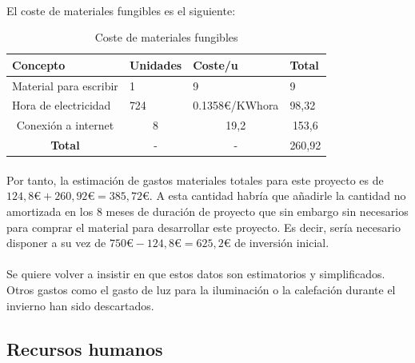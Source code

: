 \documentclass{article}
\begin{document}
\paragraph{}
El coste de materiales fungibles es el siguiente:

\begin{table}[H]
\centering
\caption{Coste de materiales fungibles}
\label{my-label}
\begin{tabular}{|l|l|l|l|}
\hline
\textbf{Concepto}                         & \textbf{Unidades}      & \textbf{Coste/u}          & \textbf{Total}              \\ \hline
Material para escribir                    & 1                      & 9                         & 9                           \\ \hline
Hora de electricidad                      & 724                    & 0.1358\euro/KWhora        & 98,32                       \\ \hline
\multicolumn{1}{|c|}{Conexión a internet} & \multicolumn{1}{c|}{8} & \multicolumn{1}{c|}{19,2} & \multicolumn{1}{c|}{153,6}  \\ \hline
\multicolumn{1}{|c|}{\textbf{Total}}      & \multicolumn{1}{c|}{-} & \multicolumn{1}{c|}{-}    & \multicolumn{1}{c|}{260,92} \\ \hline
\end{tabular}
\end{table}

\paragraph{}
Por tanto, la estimación de gastos materiales totales para este proyecto es de \\ $124,8€ + 260,92€ = 385,72€$. A esta cantidad habría que añadirle la cantidad no amortizada en los 8 meses de duración de proyecto que sin embargo sin necesarios para comprar el material para desarrollar este proyecto. Es decir, sería necesario disponer a su vez de $750€ - 124,8€  = 625,2€$ de inversión inicial.

\paragraph{}
Se quiere volver a insistir en que estos datos son estimatorios y simplificados. Otros gastos como el gasto de luz para la iluminación o la calefación durante el invierno han sido descartados.

\subsection{Recursos humanos}
\end{document}
